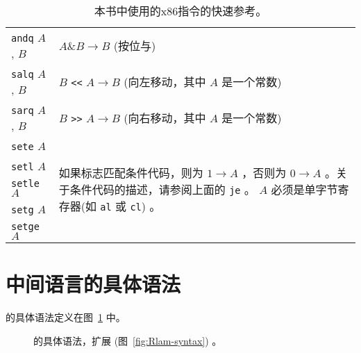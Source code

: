 \documentclass[11pt]{book}
\newcommand{\gray}[1]{{\color{gray} #1}}
\begin{document}
\begin{table}[tbp]
\begin{tabular}{l|l}
\texttt{andq} $A$, $B$ & $A \& B \to B$ \qquad (按位与)\\
\texttt{salq} $A$, $B$ & $B$ \texttt{<<} $A \to B$ (向左移动，其中 $A$ 是一个常数)\\
\texttt{sarq} $A$, $B$ & $B$ \texttt{>>} $A \to B$ (向右移动，其中 $A$ 是一个常数)\\
\texttt{sete} $A$ & \multirow{5}{3.7in}{如果标志匹配条件代码，则为 $1 \to A$ ，否则为 $0 \to A$ 。关于条件代码的描述，请参阅上面的 \texttt{je} 。 $A$ 必须是单字节寄存器(如 \texttt{al} 或 \texttt{cl}) 。} \\
\texttt{setl} $A$ & \\
\texttt{setle} $A$ & \\
\texttt{setg} $A$ & \\
\texttt{setge} $A$ &
\end{tabular}
\vspace{5pt}
  \caption{本书中使用的x86指令的快速参考。}
  \label{tab:x86-instr}
\end{table}

\cleardoublepage

\section{中间语言的具体语法}

 \LangAny{} 的具体语法定义在图~\ref{fig:Rany-concrete-syntax} 中。

\begin{figure}[tp]
\centering
\fbox{
\begin{minipage}{0.97\textwidth}\small
\[
\begin{array}{lcl}
  \Type &::=& \gray{\key{Integer} \mid \key{Boolean}
     \mid \LP\key{Vector}\;\Type\ldots\RP \mid \key{Void}} \\
    &\mid& \gray{\LP\Type\ldots \; \key{->}\; \Type\RP} \mid \key{Any} \\
\FType &::=& \key{Integer} \mid \key{Boolean} \mid \key{Void} 
      \mid \LP\key{Vector}\; \key{Any}\ldots\RP \\
     &\mid& \LP\key{Any}\ldots \; \key{->}\; \key{Any}\RP\\
\Exp &::=& \ldots \CINJECT{\Exp}{\FType}\RP \mid \CPROJECT{\Exp}{\FType}\\
  &\mid& \LP\key{any-vector-length}\;\Exp\RP
   \mid \LP\key{any-vector-ref}\;\Exp\;\Exp\RP \\
  &\mid& \LP\key{any-vector-set!}\;\Exp\;\Exp\;\Exp\RP\\
  &\mid& \LP\key{boolean?}\;\Exp\RP \mid \LP\key{integer?}\;\Exp\RP
   \mid \LP\key{void?}\;\Exp\RP \\
  &\mid& \LP\key{vector?}\;\Exp\RP \mid \LP\key{procedure?}\;\Exp\RP \\
  \Def &::=& \gray{ \CDEF{\Var}{\LS\Var \key{:} \Type\RS\ldots}{\Type}{\Exp} } \\
  \LangAny{} &::=& \gray{\Def\ldots \; \Exp}
\end{array}
\]
\end{minipage}
}
\caption{ \LangAny{} 的具体语法，扩展 \LangLam{} (图~\ref{fig:Rlam-syntax}) 。}
\label{fig:Rany-concrete-syntax}
\end{figure}
\end{document}
